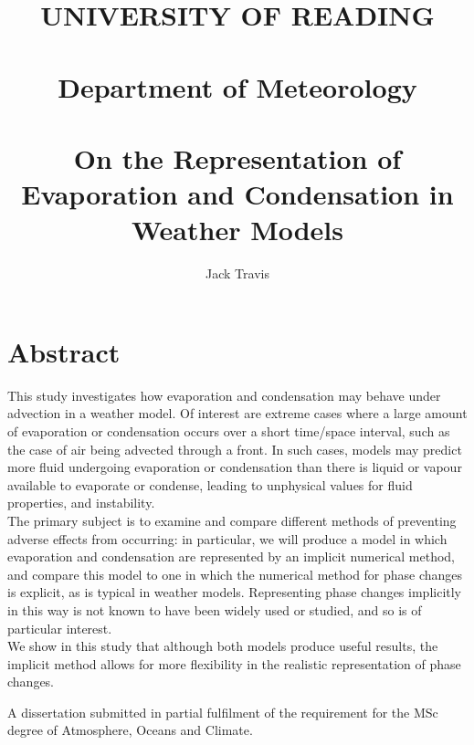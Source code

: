 \documentclass[11pt]{article}
\begin{document}
\thispagestyle{empty}
\title{UNIVERSITY OF READING\\
~\\
Department of Meteorology\\
~\\
On the Representation of Evaporation and Condensation in Weather Models}
\author{Jack Travis}
\maketitle

\section{Abstract}
This study investigates how evaporation and condensation may behave under advection in a weather model. Of interest are extreme cases where a large amount of evaporation or condensation occurs over a short time/space interval, such as the case of air being advected through a front. In such cases, models may predict more fluid undergoing evaporation or condensation than there is liquid or vapour available to evaporate or condense, leading to unphysical values for fluid properties, and instability. \\
The primary subject is to examine and compare different methods of preventing adverse effects from occurring: in particular, we will produce a model in which evaporation and condensation are represented by an implicit numerical method, and compare this model to one in which the numerical method for phase changes is explicit, as is typical in weather models. Representing phase changes implicitly in this way is not known to have been widely used or studied, and so is of particular interest. \\
We show in this study that although both models produce useful results, the implicit method allows for more flexibility in the realistic representation of phase changes.

\null \vfill
A dissertation submitted in partial fulfilment of the requirement for the MSc degree of Atmosphere, Oceans and Climate.

\newpage
\tableofcontents

\newpage
\end{document}
